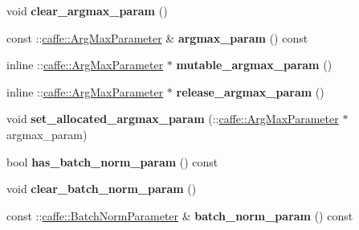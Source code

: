 \begin{DoxyCompactItemize}
\mbox{\label{classcaffe_1_1_layer_parameter_a158557df0fec0c2069e1e58a343ab98e}} 
void {\bfseries clear\+\_\+argmax\+\_\+param} ()
\item 
\mbox{\label{classcaffe_1_1_layer_parameter_a8017866c5b2772939416f70c7e2792db}} 
const \+::\mbox{\hyperlink{classcaffe_1_1_arg_max_parameter}{caffe\+::\+Arg\+Max\+Parameter}} \& {\bfseries argmax\+\_\+param} () const
\item 
\mbox{\label{classcaffe_1_1_layer_parameter_ae0e957ce09c7a077dd3e7ce431499af4}} 
inline \+::\mbox{\hyperlink{classcaffe_1_1_arg_max_parameter}{caffe\+::\+Arg\+Max\+Parameter}} $\ast$ {\bfseries mutable\+\_\+argmax\+\_\+param} ()
\item 
\mbox{\label{classcaffe_1_1_layer_parameter_abb06a952bc89c45c05f82090780d14eb}} 
inline \+::\mbox{\hyperlink{classcaffe_1_1_arg_max_parameter}{caffe\+::\+Arg\+Max\+Parameter}} $\ast$ {\bfseries release\+\_\+argmax\+\_\+param} ()
\item 
\mbox{\label{classcaffe_1_1_layer_parameter_ad69f8eedbab027ea672feedeb1352129}} 
void {\bfseries set\+\_\+allocated\+\_\+argmax\+\_\+param} (\+::\mbox{\hyperlink{classcaffe_1_1_arg_max_parameter}{caffe\+::\+Arg\+Max\+Parameter}} $\ast$argmax\+\_\+param)
\item 
\mbox{\label{classcaffe_1_1_layer_parameter_ae60efb7b23edbbb522adb659851b960c}} 
bool {\bfseries has\+\_\+batch\+\_\+norm\+\_\+param} () const
\item 
\mbox{\label{classcaffe_1_1_layer_parameter_af1cb2414b7f6a466c049973f36921698}} 
void {\bfseries clear\+\_\+batch\+\_\+norm\+\_\+param} ()
\item 
\mbox{\label{classcaffe_1_1_layer_parameter_add38eb24a5c3773dc9455f5eef7399b1}} 
const \+::\mbox{\hyperlink{classcaffe_1_1_batch_norm_parameter}{caffe\+::\+Batch\+Norm\+Parameter}} \& {\bfseries batch\+\_\+norm\+\_\+param} () const
\item 
\mbox{\label{classcaffe_1_1_layer_parameter_a47f6b7803f2cc0a160ae9740b6357d72}} 

\end{DoxyCompactItemize}
